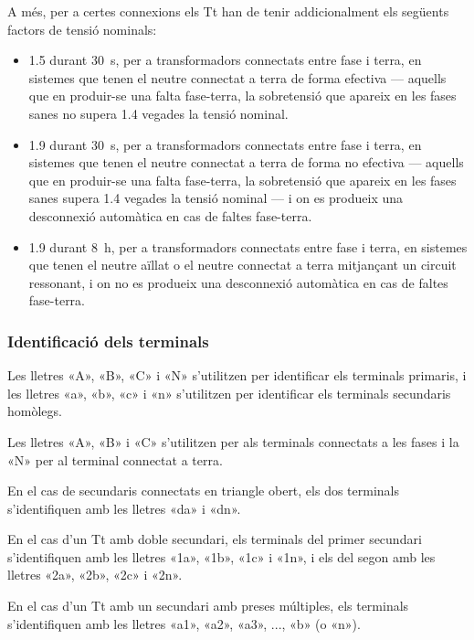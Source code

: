 A més, per a certes connexions els Tt han de tenir addicionalment els següents factors de tensió nominals:
 \begin{itemize}
   \item \num{1,5} durant \qty{30}{s},  per a transformadors connectats entre fase i terra, en sistemes que tenen el neutre connectat a terra de forma efectiva --- aquells que en produir-se una falta fase-terra, la sobretensió que apareix en les fases sanes no supera \num{1,4} vegades la tensió nominal.
   \item \num{1,9} durant \qty{30}{s},  per a transformadors connectats entre fase i terra, en sistemes que tenen el neutre connectat a terra de forma no efectiva --- aquells que en produir-se una falta fase-terra, la sobretensió que apareix en les fases sanes  supera \num{1,4} vegades la tensió nominal --- i on es produeix una desconnexió automàtica  en cas de faltes fase-terra.
   \item \num{1,9} durant \qty{8}{h},  per a transformadors connectats entre fase i terra, en sistemes que tenen el neutre aïllat o el neutre connectat a terra mitjançant un circuit ressonant, i on no es produeix una desconnexió automàtica  en cas de faltes fase-terra.
\end{itemize}

\subsubsection{Identificació dels terminals}

 Les lletres «A», «B», «C» i «N» s'utilitzen per identificar els terminals primaris, i les lletres «a», «b», «c» i «n» s'utilitzen per identificar els terminals secundaris homòlegs.

 Les lletres «A», «B» i «C» s'utilitzen per als terminals connectats a les fases i la «N» per al terminal connectat a terra.

 En el cas de secundaris connectats en triangle obert, els dos terminals s'identifiquen amb les lletres «da» i «dn».

 En el cas d'un Tt amb doble secundari, els terminals del  primer secundari s'identifiquen amb les lletres  «1a», «1b», «1c» i «1n», i els del segon amb les lletres  «2a», «2b», «2c» i «2n».

 En el cas d'un Tt amb un  secundari amb preses múltiples, els terminals s'identifiquen amb les lletres  «a1», «a2», «a3», ..., «b» (o «n»).

